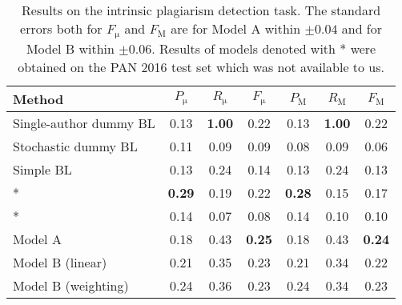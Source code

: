 \documentclass[10pt, a4paper]{article}
\begin{document}
\begin{table*}
	\caption{Results on the intrinsic plagiarism detection task. The standard errors both for $F_\mathrm{\mu}$ and $F_\mathrm{M}$ are for Model A within $\pm0.04$ and for Model B within $\pm0.06$. Results of models denoted with * were obtained on the PAN 2016 test set which was not available to us.}
	\label{tab:results-task-a}
	\begin{center}
		\begin{tabular}{l|ccc|ccc}
			\toprule
			Method & $P_\mathrm{\mu}$ & $R_\mathrm{\mu}$ & $F_\mathrm{\mu}$ & $P_\mathrm{M}$ & $R_\mathrm{M}$ & $F_\mathrm{M}$\\
			\midrule
			Single-author dummy BL 	& 0.13 & \textbf{1.00} & 0.22 & 0.13 & \textbf{1.00} & 0.22 \\
			Stochastic dummy BL 	& 0.11 & 0.09 & 0.09 & 0.08 & 0.09 & 0.06 \\
			Simple BL 				& 0.13 & 0.24 & 0.14 & 0.13 & 0.24 & 0.13 \\
			\midrule
			\citet{kuznetsov-2016}* 	& \textbf{0.29} & 0.19 & 0.22 & \textbf{0.28} & 0.15 & 0.17 \\
			\citet{sittar-2016}* 	& 0.14 & 0.07 & 0.08 & 0.14 & 0.10 & 0.10 \\
			\midrule			
			Model A 				& 0.18 & 0.43 & \textbf{0.25} & 0.18 & 0.43 & \textbf{0.24} \\			
			Model B (linear) 		& 0.21 & 0.35 & 0.23 & 0.21 & 0.34 & 0.22 \\
			Model B (weighting) 	& 0.24 & 0.36 & 0.23 & 0.24 & 0.34 & 0.23 \\
			\bottomrule
		\end{tabular}
	\end{center}
\end{table*}
\end{document}
